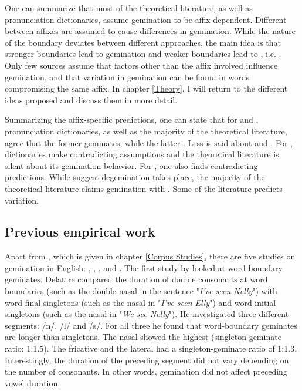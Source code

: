  
One can summarize that most of the theoretical literature, as well as pronunciation dictionaries, assume gemination to be affix-dependent. Different  between affixes are assumed to cause differences in gemination. While the nature of the boundary deviates between different approaches, the main idea is that stronger boundaries lead to gemination and weaker boundaries lead to , i.e. . Only few sources assume that factors other than the affix involved influence gemination, and that variation in gemination can be found in words compromising the same affix.  In chapter \ref{Theory}, I will return to the different ideas proposed and discuss them in more detail. 

Summarizing the affix-specific predictions, one can state that for  and , pronunciation dictionaries, as well as the majority of the theoretical literature, agree that the former geminates, while the latter . Less is said about  and . For , dictionaries make contradicting assumptions and the theoretical literature is silent about its gemination behavior. For , one also finds contradicting predictions. While \cite{Wells.2008} suggest {degemination} takes place, the majority of the theoretical literature claims gemination with . Some of the literature predicts variation. 

\subsection{Previous empirical work}\label{previous empirical work}

Apart from \cite{BenHedia.2017}, which is given in chapter \ref{Corpus Studies}, there are five studies on gemination in English: \cite{Delattre.}, \cite{ Kaye.2005}, \cite{Oh.2012}, \cite{Oh.2013}   and \cite{Kotzor.2016}.   %
The first study by \cite{Delattre.} looked at word-boundary geminates. Delattre compared the duration of double consonants at word boundaries (such as the double nasal  in the sentence "\textit{I've seen Nelly}") with word-final singletons (such as the nasal in "\textit{I've seen Elly}") and word-initial singletons (such as the nasal in "\textit{We see Nelly}"). He investigated three different segments: /n/, /l/ and /s/. For all three he found that word-boundary geminates are longer than singletons. The nasal showed the highest  (singleton-geminate ratio: 1:1.5). The fricative and the lateral had a singleton-geminate ratio of 1:1.3. Interestingly, the duration of the preceding segment did not vary depending on the number of consonants. In other words, gemination did not affect preceding vowel duration.

